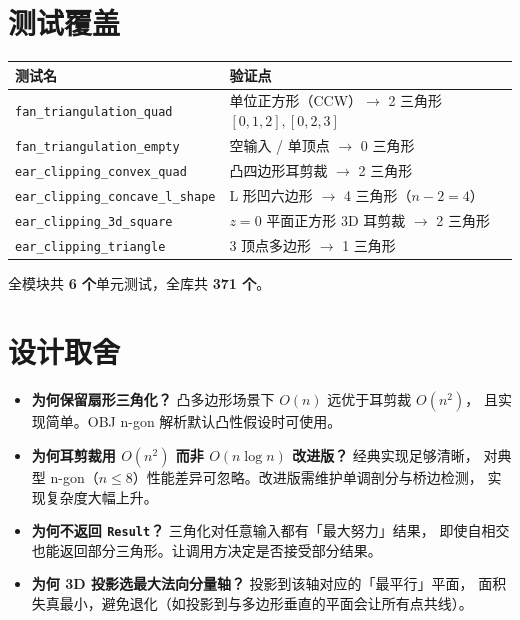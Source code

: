 \documentclass[11pt,a4paper]{article}
\begin{document}
\section{测试覆盖}

\begin{center}
\renewcommand{\arraystretch}{1.18}
\begin{tabular}{@{}ll@{}}
  \toprule
  \textbf{测试名} & \textbf{验证点} \\
  \midrule
  \texttt{fan\_triangulation\_quad}     & 单位正方形（CCW）$\to$ 2 三角形 $[0,1,2], [0,2,3]$ \\
  \texttt{fan\_triangulation\_empty}    & 空输入 / 单顶点 $\to$ 0 三角形 \\
  \texttt{ear\_clipping\_convex\_quad}  & 凸四边形耳剪裁 $\to$ 2 三角形 \\
  \texttt{ear\_clipping\_concave\_l\_shape} & L 形凹六边形 $\to$ 4 三角形（$n-2 = 4$） \\
  \texttt{ear\_clipping\_3d\_square}    & $z = 0$ 平面正方形 3D 耳剪裁 $\to$ 2 三角形 \\
  \texttt{ear\_clipping\_triangle}      & 3 顶点多边形 $\to$ 1 三角形 \\
  \bottomrule
\end{tabular}
\end{center}

全模块共 \textbf{6 个}单元测试，全库共 \textbf{371 个}。

\section{设计取舍}

\begin{itemize}
  \item \textbf{为何保留扇形三角化？} 凸多边形场景下 $O(n)$ 远优于耳剪裁 $O(n^2)$，
        且实现简单。OBJ n-gon 解析默认凸性假设时可使用。
  \item \textbf{为何耳剪裁用 $O(n^2)$ 而非 $O(n \log n)$ 改进版？} 经典实现足够清晰，
        对典型 n-gon（$n \le 8$）性能差异可忽略。改进版需维护单调剖分与桥边检测，
        实现复杂度大幅上升。
  \item \textbf{为何不返回 \texttt{Result}？} 三角化对任意输入都有「最大努力」结果，
        即使自相交也能返回部分三角形。让调用方决定是否接受部分结果。
  \item \textbf{为何 3D 投影选最大法向分量轴？} 投影到该轴对应的「最平行」平面，
        面积失真最小，避免退化（如投影到与多边形垂直的平面会让所有点共线）。
\end{itemize}
\end{document}
